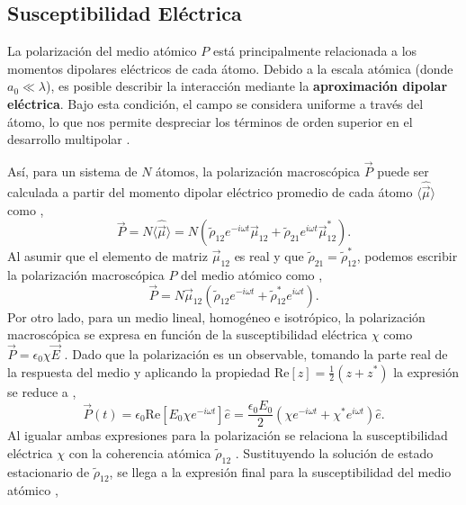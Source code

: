 \subsection{Susceptibilidad Eléctrica}
La polarización del medio atómico $P$ está principalmente relacionada a los momentos dipolares eléctricos de cada átomo. Debido a la escala atómica (donde $a_0 \ll \lambda$), es posible describir la interacción mediante la \textbf{aproximación dipolar eléctrica}. Bajo esta condición, el campo se considera uniforme a través del átomo, lo que nos permite despreciar los términos de orden superior en el desarrollo multipolar \cite{robertw.boydNonlinearOptics, danieladamsteckQuantumAtomOptics2007,allenOpticalResonanceTwolevel1975}.

Así, para un sistema de $N$ átomos, la polarización macroscópica $\vec{P}$ puede ser calculada a partir del momento dipolar eléctrico promedio de cada átomo $\langle \hat{\vec{\mu}} \rangle$ como \cite{robertw.boydNonlinearOptics, zentileElecSusProgramCalculate2015},
\begin{equation}
        \vec{P} = N \langle \hat{\vec{\mu}} \rangle = N (\tilde{\rho}_{12}e^{-i \omega t} \vec{\mu}_{12} + \tilde{\rho}_{21}e^{i \omega t} \vec{\mu}_{12}^*).
\end{equation}
Al asumir que el elemento de matriz $\vec{\mu}_{12}$ es real y que $\tilde{\rho}_{21} = \tilde{\rho}_{12}^*$, podemos escribir la polarización macroscópica $P$ del medio atómico como \cite{siddonsAbsoluteAbsorptionRubidium2008},
\begin{equation*}
    \vec{P} = N \vec{\mu}_{12} (\tilde{\rho}_{12}e^{-i \omega t}  + \tilde{\rho}_{12}^*e^{i \omega t}).
\end{equation*}
Por otro lado, para un medio lineal, homogéneo e isotrópico, la polarización macroscópica se expresa en función de la susceptibilidad eléctrica $\chi$ como $\vec{P} = \epsilon_0 \chi \vec{E}$ \cite{hechtOptics2017}. Dado que la polarización es un observable, tomando la parte real de la respuesta del medio y aplicando la propiedad $\text{Re}[z] = \frac{1}{2}(z + z^*)$ la expresión se reduce a \cite{allenOpticalResonanceTwolevel1975},
\begin{equation}
    \vec{P}(t) = \epsilon_0 \text{Re}\left[ E_0 \chi e^{-i\omega t} \right]\hat{e} = \frac{\epsilon_0 E_0}{2}\left( \chi e^{-i\omega t} + \chi^* e^{i\omega t} \right)\hat{e}.
\end{equation}
Al igualar ambas expresiones para la polarización se relaciona la susceptibilidad eléctrica $\chi$ con la coherencia atómica $\tilde{\rho}_{12}$ \cite{allenOpticalResonanceTwolevel1975}. Sustituyendo la solución de estado estacionario de $\tilde{\rho}_{12}$, se llega a la expresión final para la susceptibilidad del medio atómico \cite{siddonsAbsoluteAbsorptionRubidium2008, wellerAbsoluteAbsorptionDispersion2012},
